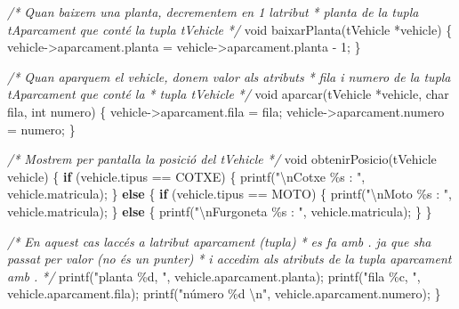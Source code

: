 \documentclass[
]{book}
\newenvironment{Shaded}{\begin{snugshade}}{\end{snugshade}}
\newcommand{\CommentTok}[1]{\textcolor[rgb]{0.56,0.35,0.01}{\textit{#1}}}
\newcommand{\ControlFlowTok}[1]{\textcolor[rgb]{0.13,0.29,0.53}{\textbf{#1}}}
\newcommand{\DataTypeTok}[1]{\textcolor[rgb]{0.13,0.29,0.53}{#1}}
\newcommand{\DecValTok}[1]{\textcolor[rgb]{0.00,0.00,0.81}{#1}}
\newcommand{\NormalTok}[1]{#1}
\newcommand{\SpecialCharTok}[1]{\textcolor[rgb]{0.00,0.00,0.00}{#1}}
\newcommand{\StringTok}[1]{\textcolor[rgb]{0.31,0.60,0.02}{#1}}
\begin{document}
\begin{Shaded}
\begin{Highlighting}[]
\CommentTok{/* Quan baixem una planta, decrementem en 1 l\textquotesingle{}atribut}
\CommentTok{ * planta de la tupla tAparcament que conté la tupla tVehicle }
\CommentTok{ */}
\DataTypeTok{void}\NormalTok{ baixarPlanta(tVehicle *vehicle) \{}
\NormalTok{    vehicle{-}\textgreater{}aparcament.planta = vehicle{-}\textgreater{}aparcament.planta {-} }\DecValTok{1}\NormalTok{;}
\NormalTok{\}}

\CommentTok{/* Quan aparquem el vehicle, donem valor als atributs}
\CommentTok{ * fila i numero de la tupla tAparcament que conté la }
\CommentTok{ * tupla tVehicle }
\CommentTok{ */}
\DataTypeTok{void}\NormalTok{ aparcar(tVehicle *vehicle, }\DataTypeTok{char}\NormalTok{ fila, }\DataTypeTok{int}\NormalTok{ numero) \{}
\NormalTok{    vehicle{-}\textgreater{}aparcament.fila = fila;}
\NormalTok{    vehicle{-}\textgreater{}aparcament.numero = numero;}
\NormalTok{\}}

\CommentTok{/* Mostrem per pantalla la posició del tVehicle */} 
\DataTypeTok{void}\NormalTok{ obtenirPosicio(tVehicle vehicle) \{}
    \ControlFlowTok{if}\NormalTok{ (vehicle.tipus == COTXE) \{}
\NormalTok{        printf(}\StringTok{"}\SpecialCharTok{\textbackslash{}n}\StringTok{Cotxe \%s : "}\NormalTok{, vehicle.matricula);}
\NormalTok{    \} }\ControlFlowTok{else}\NormalTok{ \{}
        \ControlFlowTok{if}\NormalTok{ (vehicle.tipus == MOTO) \{}
\NormalTok{            printf(}\StringTok{"}\SpecialCharTok{\textbackslash{}n}\StringTok{Moto \%s : "}\NormalTok{, vehicle.matricula);}
\NormalTok{        \} }\ControlFlowTok{else}\NormalTok{ \{}
\NormalTok{            printf(}\StringTok{"}\SpecialCharTok{\textbackslash{}n}\StringTok{Furgoneta \%s : "}\NormalTok{, vehicle.matricula);}
\NormalTok{        \}}
\NormalTok{    \}}
    
    \CommentTok{/* En aquest cas l\textquotesingle{}accés a l\textquotesingle{}atribut aparcament (tupla)}
\CommentTok{     * es fa amb \textquotesingle{}.\textquotesingle{} ja que s\textquotesingle{}ha passat per valor (no és un punter)}
\CommentTok{     * i accedim als atributs de la tupla aparcament amb \textquotesingle{}.\textquotesingle{} }
\CommentTok{     */}
\NormalTok{    printf(}\StringTok{"planta \%d, "}\NormalTok{, vehicle.aparcament.planta);}
\NormalTok{    printf(}\StringTok{"fila \%c, "}\NormalTok{, vehicle.aparcament.fila);}
\NormalTok{    printf(}\StringTok{"número \%d }\SpecialCharTok{\textbackslash{}n}\StringTok{"}\NormalTok{, vehicle.aparcament.numero);}
\NormalTok{\}}
\end{Highlighting}
\end{Shaded}
\end{document}
